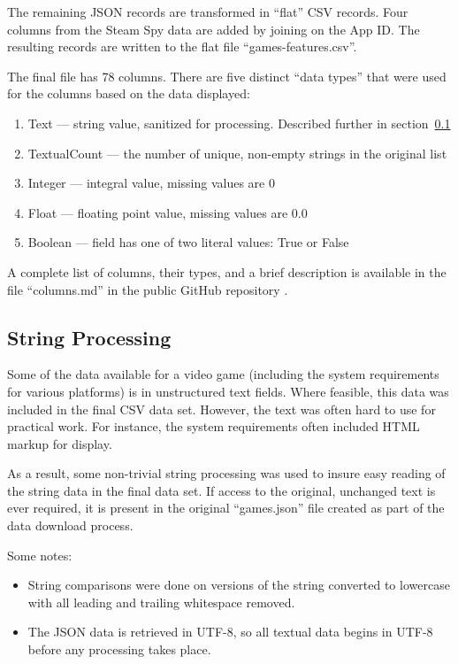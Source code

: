 \documentclass[10pt,journal,compsoc]{IEEEtran}
\begin{document}
The remaining JSON records are transformed in ``flat'' CSV records. Four
columns from the Steam Spy data are added by joining on the App ID\@. The
resulting records are written to the flat file ``games-features.csv''.

The final file has 78 columns. There are five distinct ``data types'' that
were used for the columns based on the data displayed:

\begin{enumerate}
    \item Text --- string value, sanitized for processing. Described further in
    section~\ref{data-strings}
    \item TextualCount --- the number of unique, non-empty strings in the original list
    \item Integer --- integral value, missing values are 0
    \item Float --- floating point value, missing values are 0.0
    \item Boolean --- field has one of two literal values: True or False
\end{enumerate}

A complete list of columns, their types, and a brief description is
available in the file ``columns.md'' in the public GitHub repository
\cite{our-columns}.

\subsection{String Processing}

\label{data-strings}

Some of the data available for a video game (including the system requirements
for various platforms) is in unstructured text fields. Where feasible, this data
was included in the final CSV data set. However, the text was often hard to use
for practical work. For instance, the system requirements often included HTML
markup for display.

As a result, some non-trivial string processing was used to insure easy reading
of the string data in the final data set. If access to the original, unchanged
text is ever required, it is present in the original ``games.json'' file created
as part of the data download process.

Some notes:

\begin{itemize}
    \item String comparisons were done on versions of the string converted to
    lowercase with all leading and trailing whitespace removed.
    \item The JSON data is retrieved in UTF-8, so all textual data begins in
    UTF-8 before any processing takes place.
\end{itemize}
\end{document}
